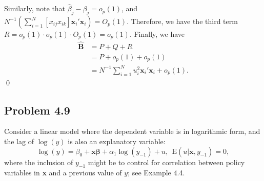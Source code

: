 \documentclass[10pt]{article}
\newcommand{\E}{\text{E}}
\begin{document}
Similarly, note that $\hat{\beta}_j-\beta_j=o_p(1)$, and $N^{-1}\left(\sum_{i=1}^{N}[x_{ij}x_{ik}] \mathbf{x}_i'\mathbf{x}_i\right)=O_p(1).$ Therefore, we have the third term $R=o_p(1)\cdot o_p(1)\cdot O_p(1)=o_p(1).$ Finally, we have
\begin{align*}
    \hat{\mathbf{B}}&=P+Q+R\\
    &=P+o_p(1)+o_p(1)\\
    &=N^{-1} \sum_{i=1}^{N}u_i^2 \mathbf{x}_i'\mathbf{x}_i+o_p(1).
\end{align*}\qed

\subsection*{Problem 4.9}
Consider a linear model where the dependent variable is in logarithmic form, and the lag of $\log(y)$ is also an explanatory variable:
\[\log(y)=\beta_0+\textbf{x}\pmb{\beta}+\alpha_1\log(y_{-1})+u,\ \ \E(u|\textbf{x},y_{-1})=0,\]
where the inclusion of $y_{-1}$ might be to control for correlation between policy variables in \textbf{x} and a previous value of $y$; see Example 4.4.
\end{document}
